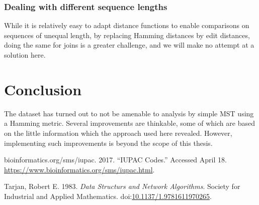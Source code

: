 \documentclass[fleqn]{book}
\begin{document}
\subsection{Dealing with different sequence
lengths}\label{dealing-with-different-sequence-lengths}

While it is relatively easy to adapt distance functions to enable
comparisons on sequences of unequal length, by replacing Hamming
distances by edit distances, doing the same for joins is a greater
challenge, and we will make no attempt at a solution here.

\chapter{Conclusion}\label{conclusion}

The dataset has turned out to not be amenable to analysis by simple MST
using a Hamming metric. Several improvements are thinkable, some of
which are based on the little information which the approach used here
revealed. However, implementing such improvements is beyond the scope of
this thesis.

\hypertarget{refs}{}
\hypertarget{ref-iupacodes}{}
bioinformatics.org/sms/iupac. 2017. ``IUPAC Codes.'' Accessed April 18.
\url{https://www.bioinformatics.org/sms/iupac.html}.

\hypertarget{ref-tarjan1983}{}
Tarjan, Robert E. 1983. \emph{Data Structurs and Network Algorithms}.
Society for Industrial and Applied Mathematics.
doi:\href{https://doi.org/10.1137/1.9781611970265}{10.1137/1.9781611970265}.
\end{document}
